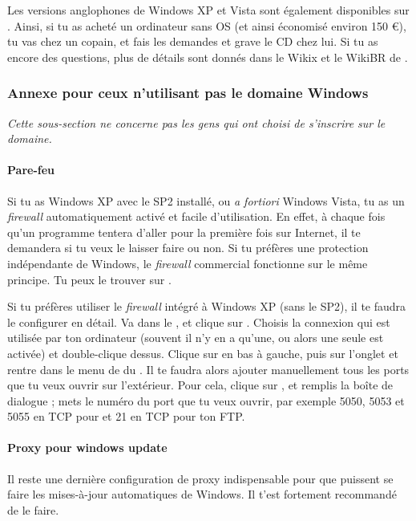 Les versions anglophones de Windows XP et Vista sont également disponibles sur .
Ainsi, si tu as acheté un ordinateur sans OS (et ainsi économisé environ 150 \euro), tu vas chez un copain, et fais les demandes et grave le CD chez lui. Si tu as encore des questions, plus de détails sont donnés dans le Wikix et le WikiBR de \fkz.


\subsubsection{Annexe pour ceux n'utilisant pas le domaine Windows}

\label{horsdomaine} \emph{Cette sous-section ne concerne pas les gens qui ont choisi de s'inscrire sur le domaine.}

\paragraph{Pare-feu} Si tu as Windows XP avec le SP2 installé, ou \emph{a fortiori}
Windows Vista, tu as un \emph{firewall} automatiquement activé et facile d'utilisation. En effet, à chaque fois qu'un programme tentera d'aller pour
la première fois sur Internet, il te demandera si tu veux le laisser faire ou non. Si tu préfères une protection indépendante de Windows, le
\emph{firewall} commercial  fonctionne sur le même principe. Tu peux le trouver sur \xshare.

Si tu préfères utiliser le \emph{firewall} intégré à Windows XP (sans le SP2), il te faudra le configurer en détail. Va dans le ,
 et clique sur . Choisis la connexion qui est utilisée par ton ordinateur (souvent il n'y en a qu'une, ou
alors une seule est activée) et double-clique dessus. Clique sur  en bas à gauche, puis sur l'onglet  et rentre dans le
menu de  du . Il te faudra alors ajouter manuellement tous les ports que tu veux ouvrir sur l'extérieur. Pour
cela, clique sur , et remplis la boîte de dialogue%
; mets le numéro du port que tu veux ouvrir, par exemple 5050, 5053 et 5055 en TCP pour  et 21 en TCP pour ton FTP.

\paragraph{Proxy pour windows update} Il reste une dernière configuration de
proxy indispensable pour que puissent se faire les mises-à-jour automatiques
de Windows. Il t'est fortement recommandé de le faire.

